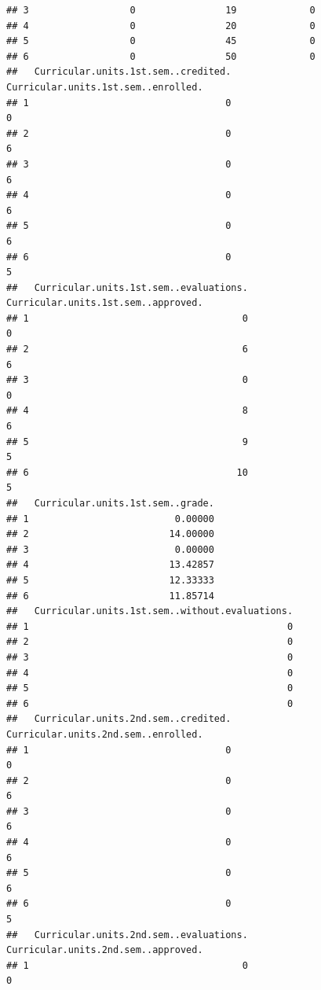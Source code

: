 \documentclass[
]{article}
\begin{document}
\begin{verbatim}
## 3                  0                19             0
## 4                  0                20             0
## 5                  0                45             0
## 6                  0                50             0
##   Curricular.units.1st.sem..credited. Curricular.units.1st.sem..enrolled.
## 1                                   0                                   0
## 2                                   0                                   6
## 3                                   0                                   6
## 4                                   0                                   6
## 5                                   0                                   6
## 6                                   0                                   5
##   Curricular.units.1st.sem..evaluations. Curricular.units.1st.sem..approved.
## 1                                      0                                   0
## 2                                      6                                   6
## 3                                      0                                   0
## 4                                      8                                   6
## 5                                      9                                   5
## 6                                     10                                   5
##   Curricular.units.1st.sem..grade.
## 1                          0.00000
## 2                         14.00000
## 3                          0.00000
## 4                         13.42857
## 5                         12.33333
## 6                         11.85714
##   Curricular.units.1st.sem..without.evaluations.
## 1                                              0
## 2                                              0
## 3                                              0
## 4                                              0
## 5                                              0
## 6                                              0
##   Curricular.units.2nd.sem..credited. Curricular.units.2nd.sem..enrolled.
## 1                                   0                                   0
## 2                                   0                                   6
## 3                                   0                                   6
## 4                                   0                                   6
## 5                                   0                                   6
## 6                                   0                                   5
##   Curricular.units.2nd.sem..evaluations. Curricular.units.2nd.sem..approved.
## 1                                      0                                   0

\end{verbatim}
\end{document}
